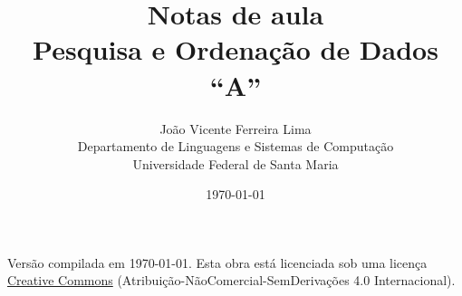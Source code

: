 \documentclass[a4paper,12pt,twoside]{report}
\title{{\bf Notas de aula\\
Pesquisa e Ordenação de Dados ``A''}}
\author{
João Vicente Ferreira Lima\\
Departamento de Linguagens e Sistemas de Computação\\
Universidade Federal de Santa Maria
}
\date{\today}
\begin{document}
\maketitle

Versão compilada em \today.
Esta obra está licenciada sob uma licença \href{http://creativecommons.org/licenses/by-nc-nd/4.0/deed.pt_BR}{Creative Commons} (Atribuição-NãoComercial-SemDerivações 4.0 Internacional).

\pagestyle{fancy}

\tableofcontents



%
\end{document}
